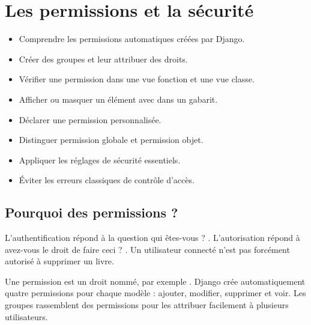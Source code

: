 \chapter{Les permissions et la sécurité}
\label{ch:permissions}


\begin{objectifs}
\begin{itemize}
  \item Comprendre les permissions automatiques créées par Django.
  \item Créer des groupes et leur attribuer des droits.
  \item Vérifier une permission dans une vue fonction et une vue classe.
  \item Afficher ou masquer un élément avec  dans un gabarit.
  \item Déclarer une permission personnalisée.
  \item Distinguer permission globale et permission objet.
  \item Appliquer les réglages de sécurité essentiels.
  \item Éviter les erreurs classiques de contrôle d'accès.
\end{itemize}
\end{objectifs}

\section{Pourquoi des permissions ?}

L'authentification répond à la question \og qui êtes-vous ? \fg. L'autorisation
répond à \og avez-vous le droit de faire ceci ? \fg. Un utilisateur connecté n'est
pas forcément autorisé à supprimer un livre.

\begin{retenir}
Une permission est un droit nommé, par exemple . Django
crée automatiquement quatre permissions pour chaque modèle : ajouter, modifier,
supprimer et voir. Les groupes rassemblent des permissions pour les attribuer
facilement à plusieurs utilisateurs.
\end{retenir}

